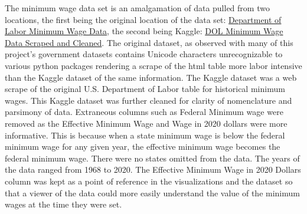 \documentclass[reqno,11pt]{amsart}
\begin{document}
The minimum wage data set is an amalgamation of data pulled from two locations, 
the first being the original location of the data set: 
\href{https://www.dol.gov/agencies/whd/minimum-wage}{Department of Labor Minimum Wage Data}, 
the second being Kaggle: 
\href{https://www.kaggle.com/lislejoem/us-minimum-wage-by-state-from-1968-to-2017}{DOL Minimum Wage Data Scraped and Cleaned}. 
The original dataset, as observed with many of this project’s government datasets contains Unicode characters unrecognizable 
to various python packages rendering a scrape of the html table more labor intensive than the Kaggle dataset of the same information. 
The Kaggle dataset was a web scrape of the original U.S. Department of Labor table for historical minimum wages. 
This Kaggle dataset was further cleaned for clarity of nomenclature and parsimony of data. Extraneous columns such as 
Federal Minimum wage were removed as the Effective Minimum Wage and Wage in 2020 dollars were more informative. 
This is because when a state minimum wage is below the federal minimum wage for any given year, the effective minimum 
wage becomes the federal minimum wage. There were no states omitted from the data. The years of the data ranged from 
1968 to 2020. The Effective Minimum Wage in 2020 Dollars column was kept as a point of reference in the visualizations 
and the dataset so that a viewer of the data could more easily understand the value of the minimum wages at the time they were set.
\end{document}
